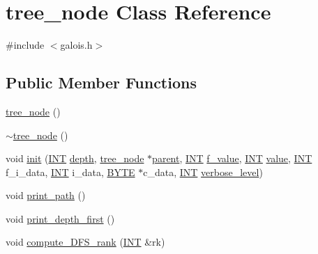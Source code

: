 \hypertarget{classtree__node}{}\section{tree\+\_\+node Class Reference}
\label{classtree__node}


{\ttfamily \#include $<$galois.\+h$>$}

\subsection*{Public Member Functions}
\begin{DoxyCompactItemize}
\item 
\mbox{\hyperlink{classtree__node_ae69bca4e58b23582f802c3ba2d7cd44e}{tree\+\_\+node}} ()
\item 
\mbox{\hyperlink{classtree__node_ad9952ee925cb2b4503ea1200fe0fe32a}{$\sim$tree\+\_\+node}} ()
\item 
void \mbox{\hyperlink{classtree__node_a7e0bd233bb60c847a331b009c6ca7a41}{init}} (\mbox{\hyperlink{galois_8h_a09fddde158a3a20bd2dcadb609de11dc}{I\+NT}} \mbox{\hyperlink{classtree__node_aa5529f7dcfe7aeda758c538cb4b5a6e6}{depth}}, \mbox{\hyperlink{classtree__node}{tree\+\_\+node}} $\ast$\mbox{\hyperlink{classtree__node_a649ed45f2f6567a59e9cd53024a8ba41}{parent}}, \mbox{\hyperlink{galois_8h_a09fddde158a3a20bd2dcadb609de11dc}{I\+NT}} \mbox{\hyperlink{classtree__node_ad9a2e980d0a2215b687a2fb110bcc749}{f\+\_\+value}}, \mbox{\hyperlink{galois_8h_a09fddde158a3a20bd2dcadb609de11dc}{I\+NT}} \mbox{\hyperlink{classtree__node_a16080347be28a0cfa223c05b52524720}{value}}, \mbox{\hyperlink{galois_8h_a09fddde158a3a20bd2dcadb609de11dc}{I\+NT}} f\+\_\+i\+\_\+data, \mbox{\hyperlink{galois_8h_a09fddde158a3a20bd2dcadb609de11dc}{I\+NT}} i\+\_\+data, \mbox{\hyperlink{galois_8h_ab6cc7b4aeb6ea31aba2b3fbfc83ff5e6}{B\+Y\+TE}} $\ast$c\+\_\+data, \mbox{\hyperlink{galois_8h_a09fddde158a3a20bd2dcadb609de11dc}{I\+NT}} \mbox{\hyperlink{simeon_8_c_a818073fbcc2f439e7c56952f67386122}{verbose\+\_\+level}})
\item 
void \mbox{\hyperlink{classtree__node_a307c87f5c15e7e4452089ed6e8248efd}{print\+\_\+path}} ()
\item 
void \mbox{\hyperlink{classtree__node_a19c74e6fb9f581b092140d9b1c6b544a}{print\+\_\+depth\+\_\+first}} ()
\item 
void \mbox{\hyperlink{classtree__node_afac9d585d72b1fb7e1a33e8b5535cce0}{compute\+\_\+\+D\+F\+S\+\_\+rank}} (\mbox{\hyperlink{galois_8h_a09fddde158a3a20bd2dcadb609de11dc}{I\+NT}} \&rk)

\end{DoxyCompactItemize}
